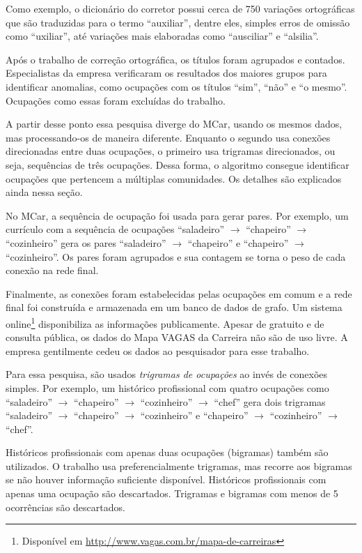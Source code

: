 \documentclass[
  article,
  11pt,
  a4paper,
  english,
  brazil,
  sumario=tradicional]{abntex2}
\begin{document}
Como exemplo, o dicionário do corretor possui cerca de 750 variações ortográficas que são traduzidas para o termo \enquote{auxiliar}, dentre eles, simples erros de omissão como \enquote{uxiliar}, até variações mais elaboradas como \enquote{ausciliar} e \enquote{alsilia}.

Após o trabalho de correção ortográfica, os títulos foram agrupados e contados. Especialistas da empresa verificaram os resultados dos maiores grupos para identificar anomalias, como ocupações com os títulos \enquote{sim}, \enquote{não} e \enquote{o mesmo}. Ocupações como essas foram excluídas do trabalho.

A partir desse ponto essa pesquisa diverge do MCar, usando os mesmos dados, mas processando-os de maneira diferente. Enquanto o segundo usa conexões direcionadas entre duas ocupações, o primeiro usa trigramas direcionados, ou seja, sequências de três ocupações.  Dessa forma, o algoritmo consegue identificar ocupações que pertencem a múltiplas comunidades. Os detalhes são explicados ainda nessa seção.

No MCar, a sequência de ocupação foi usada para gerar pares. Por exemplo, um currículo com a sequência de ocupações \enquote{saladeiro} $\to$ \enquote{chapeiro} $\to$ \enquote{cozinheiro} gera os pares \enquote{saladeiro} $\to$ \enquote{chapeiro} e \enquote{chapeiro} $\to$ \enquote{cozinheiro}. Os pares foram agrupados e sua contagem se torna o peso de cada conexão na rede final.

Finalmente, as conexões foram estabelecidas pelas ocupações em comum e a rede final foi construída e armazenada em um banco de dados de grafo. Um sistema online\footnote{Disponível em \url{http://www.vagas.com.br/mapa-de-carreiras}} disponibiliza as informações publicamente. Apesar de gratuito e de consulta pública, os dados do Mapa VAGAS da Carreira não são de uso livre. A empresa gentilmente cedeu os dados ao pesquisador para esse trabalho.

Para essa pesquisa, são usados \textit{trigramas de ocupações} ao invés de conexões simples. Por exemplo, um histórico profissional com quatro ocupações como \enquote{saladeiro} $\to$ \enquote{chapeiro} $\to$ \enquote{cozinheiro} $\to$ \enquote{chef} gera dois trigramas \enquote{saladeiro} $\to$ \enquote{chapeiro} $\to$ \enquote{cozinheiro} e \enquote{chapeiro} $\to$ \enquote{cozinheiro} $\to$ \enquote{chef}. 

Históricos profissionais com apenas duas ocupações (bigramas) também são utilizados. O trabalho usa preferencialmente trigramas, mas recorre aos bigramas se não houver informação suficiente disponível. Históricos profissionais com apenas uma ocupação são descartados. Trigramas e bigramas com menos de 5 ocorrências são descartados.
\end{document}
